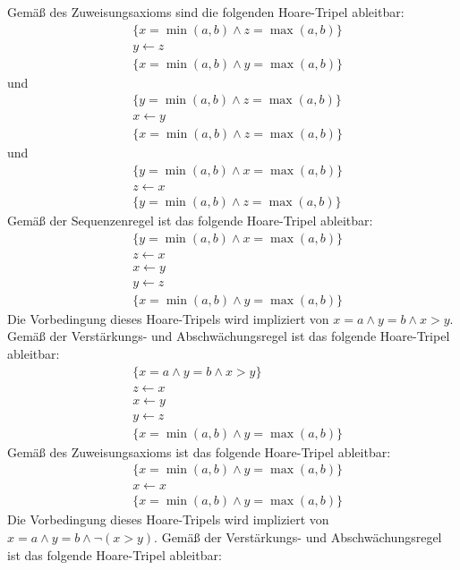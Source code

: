 \documentclass[12pt]{article}
\begin{document}
\begin{loesung}
  Gemäß des Zuweisungsaxioms sind die folgenden Hoare-Tripel ableitbar:
  \begin{align*}
    & \{ x = \min(a, b) \land z = \max(a, b) \} \\
    & y \gets z \\
    & \{ x = \min(a, b) \land y = \max(a, b) \}
  \end{align*}
  und
  \begin{align*}
    & \{ y = \min(a, b) \land z = \max(a, b) \} \\
    & x \gets y \\
    & \{ x = \min(a, b) \land z = \max(a, b) \}
  \end{align*}
  und
  \begin{align*}
    & \{ y = \min(a, b) \land x = \max(a, b) \} \\
    & z \gets x \\
    & \{ y = \min(a, b) \land z = \max(a, b) \}
  \end{align*}
  Gemäß der Sequenzenregel ist das folgende Hoare-Tripel ableitbar:
  \begin{align*}
    & \{ y = \min(a, b) \land x = \max(a, b) \} \\
    & z \gets x \\
    & x \gets y \\
    & y \gets z \\
    & \{ x = \min(a, b) \land y = \max(a, b) \}
  \end{align*}
  Die Vorbedingung dieses Hoare-Tripels wird impliziert von $x = a \land y = b \land x > y$. Gemäß der Verstärkungs- und Abschwächungsregel ist das folgende Hoare-Tripel ableitbar:
  \begin{align*}
    & \{ x = a \land y = b \land x > y \} \\
    & z \gets x \\
    & x \gets y \\
    & y \gets z \\
    & \{ x = \min(a, b) \land y = \max(a, b) \}
  \end{align*}
  Gemäß des Zuweisungsaxioms ist das folgende Hoare-Tripel ableitbar:
  \begin{align*}
    & \{ x = \min(a, b) \land y = \max(a, b) \} \\
    & x \gets x \\
    & \{ x = \min(a, b) \land y = \max(a, b) \}
  \end{align*}
  Die Vorbedingung dieses Hoare-Tripels wird impliziert von $x = a \land y = b \land \neg (x > y)$. Gemäß der Verstärkungs- und Abschwächungsregel ist das folgende Hoare-Tripel ableitbar:

\end{loesung}
\end{document}
